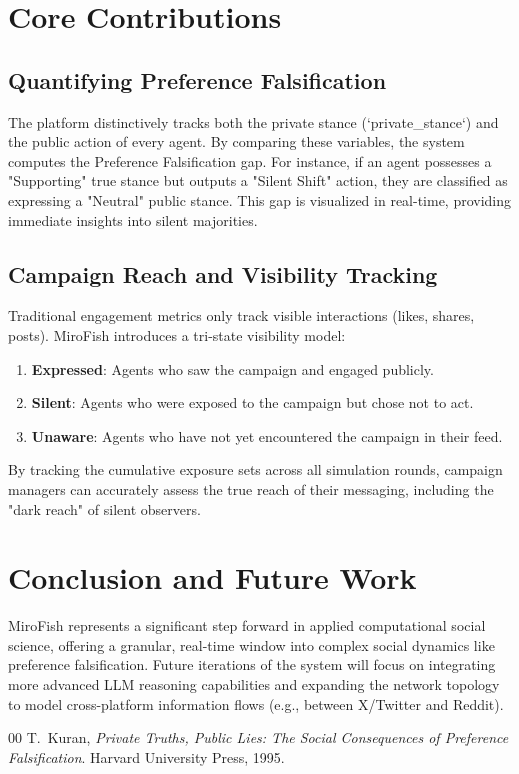 \documentclass[conference]{IEEEtran}
\begin{document}
\section{Core Contributions}

\subsection{Quantifying Preference Falsification}
The platform distinctively tracks both the private stance (`private_stance`) and the public action of every agent. By comparing these variables, the system computes the Preference Falsification gap. For instance, if an agent possesses a "Supporting" true stance but outputs a "Silent Shift" action, they are classified as expressing a "Neutral" public stance. This gap is visualized in real-time, providing immediate insights into silent majorities.

\subsection{Campaign Reach and Visibility Tracking}
Traditional engagement metrics only track visible interactions (likes, shares, posts). MiroFish introduces a tri-state visibility model:
\begin{enumerate}
    \item \textbf{Expressed}: Agents who saw the campaign and engaged publicly.
    \item \textbf{Silent}: Agents who were exposed to the campaign but chose not to act.
    \item \textbf{Unaware}: Agents who have not yet encountered the campaign in their feed.
\end{enumerate}
By tracking the cumulative exposure sets across all simulation rounds, campaign managers can accurately assess the true reach of their messaging, including the "dark reach" of silent observers.

\section{Conclusion and Future Work}
MiroFish represents a significant step forward in applied computational social science, offering a granular, real-time window into complex social dynamics like preference falsification. Future iterations of the system will focus on integrating more advanced LLM reasoning capabilities and expanding the network topology to model cross-platform information flows (e.g., between X/Twitter and Reddit).


\begin{thebibliography}{00}
T.~Kuran, \textit{Private Truths, Public Lies: The Social Consequences of Preference Falsification}. Harvard University Press, 1995.
\end{thebibliography}
\end{document}
